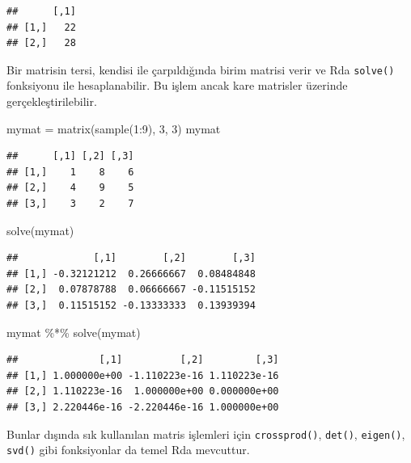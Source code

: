 \documentclass[
]{book}
\newenvironment{Shaded}{\begin{snugshade}}{\end{snugshade}}
\newcommand{\DecValTok}[1]{\textcolor[rgb]{0.00,0.00,0.81}{#1}}
\newcommand{\FunctionTok}[1]{\textcolor[rgb]{0.00,0.00,0.00}{#1}}
\newcommand{\NormalTok}[1]{#1}
\newcommand{\OtherTok}[1]{\textcolor[rgb]{0.56,0.35,0.01}{#1}}
\newcommand{\SpecialCharTok}[1]{\textcolor[rgb]{0.00,0.00,0.00}{#1}}
\begin{document}
\begin{verbatim}
##      [,1]
## [1,]   22
## [2,]   28
\end{verbatim}

Bir matrisin tersi, kendisi ile çarpıldığında birim matrisi verir ve Rda \texttt{solve()} fonksiyonu ile hesaplanabilir. Bu işlem ancak kare matrisler üzerinde gerçekleştirilebilir.

\begin{Shaded}
\begin{Highlighting}[]
\NormalTok{mymat }\OtherTok{=} \FunctionTok{matrix}\NormalTok{(}\FunctionTok{sample}\NormalTok{(}\DecValTok{1}\SpecialCharTok{:}\DecValTok{9}\NormalTok{), }\DecValTok{3}\NormalTok{, }\DecValTok{3}\NormalTok{)}
\NormalTok{mymat}
\end{Highlighting}
\end{Shaded}

\begin{verbatim}
##      [,1] [,2] [,3]
## [1,]    1    8    6
## [2,]    4    9    5
## [3,]    3    2    7
\end{verbatim}

\begin{Shaded}
\begin{Highlighting}[]
\FunctionTok{solve}\NormalTok{(mymat)}
\end{Highlighting}
\end{Shaded}

\begin{verbatim}
##             [,1]        [,2]        [,3]
## [1,] -0.32121212  0.26666667  0.08484848
## [2,]  0.07878788  0.06666667 -0.11515152
## [3,]  0.11515152 -0.13333333  0.13939394
\end{verbatim}

\begin{Shaded}
\begin{Highlighting}[]
\NormalTok{mymat }\SpecialCharTok{\%*\%} \FunctionTok{solve}\NormalTok{(mymat)}
\end{Highlighting}
\end{Shaded}

\begin{verbatim}
##              [,1]          [,2]         [,3]
## [1,] 1.000000e+00 -1.110223e-16 1.110223e-16
## [2,] 1.110223e-16  1.000000e+00 0.000000e+00
## [3,] 2.220446e-16 -2.220446e-16 1.000000e+00
\end{verbatim}

Bunlar dışında sık kullanılan matris işlemleri için \texttt{crossprod()}, \texttt{det()}, \texttt{eigen()}, \texttt{svd()} gibi fonksiyonlar da temel Rda mevcuttur.
\end{document}
